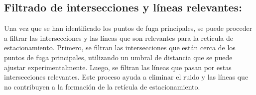 \subsection{Filtrado de intersecciones y líneas relevantes:}

Una vez que se han identificado los puntos de fuga principales, se puede proceder a filtrar las intersecciones y las líneas que son
relevantes para la retícula de estacionamiento.
Primero, se filtran las intersecciones que están cerca de los puntos de fuga principales, utilizando un umbral de distancia que se puede ajustar experimentalmente.
Luego, se filtran las líneas que pasan por estas intersecciones relevantes.
Este proceso ayuda a eliminar el ruido y las líneas que no contribuyen a la formación de la retícula de estacionamiento.
